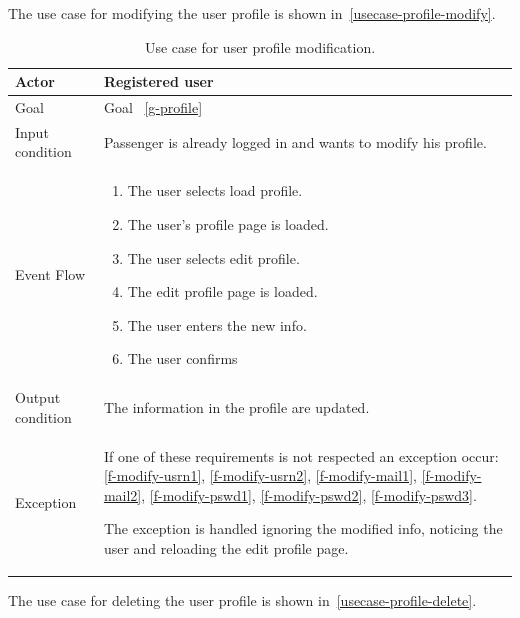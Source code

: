 The use case for modifying the user profile is shown in~\autoref{usecase-profile-modify}.

\begin{table}
\begin{center}
\begin{tabular}{| l | p{} |}
\hline
Actor & Registered user \\
\hline
Goal & Goal ~\ref{g-profile}
\\
\hline
Input condition & Passenger is already logged in and wants to modify his profile.  \\
\hline
Event Flow & \begin{enumerate}
	\item The user selects load profile.
	\item The user's profile page is loaded.
	\item The user selects edit profile.
	\item The edit profile page is loaded.
	\item The user enters the new info.
	\item The user confirms
	\end{enumerate}
\\
\hline
Output condition & The information in the profile are updated. \\
\hline

Exception & If one of these requirements is not respected an exception occur:
\ref{f-modify-usrn1},
\ref{f-modify-usrn2},
\ref{f-modify-mail1},
\ref{f-modify-mail2},
\ref{f-modify-pswd1},
\ref{f-modify-pswd2},
\ref{f-modify-pswd3}.

The exception is handled ignoring the modified info, noticing the user and reloading the edit profile page. \\
\hline
\end{tabular}
\end{center}
\caption{Use case for user profile modification.}
\label{usecase-profile-modify}
\end{table}


The use case for deleting the user profile is shown in~\autoref{usecase-profile-delete}.


